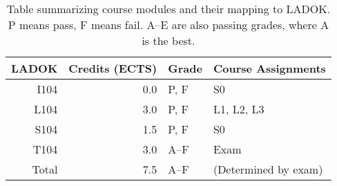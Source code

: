 \begin{table}
  \centering
  \setlength{\tabcolsep}{0.5em}
  \begin{tabular}{rrll}
    \toprule
    \textbf{LADOK}
    & \textbf{Credits (ECTS)}
    & \textbf{Grade}
    & \textbf{Course Assignments}
    \\
    \midrule
    I104  & 0.0             & P, F        & S0\\
    L104  & 3.0             & P, F        & L1, L2, L3\\
    S104  & 1.5             & P, F        & S0\\
    T104  & 3.0             & A--F        & Exam\\
    \midrule
    Total & 7.5             & A--F        & (Determined by exam)\\
    \bottomrule
  \end{tabular}
  \caption{%
    Table summarizing course modules and their mapping to LADOK\@.
    P means pass, F means fail.
    A--E are also passing grades, where A is the best.
  }\label{LADOKTable}
\end{table}

